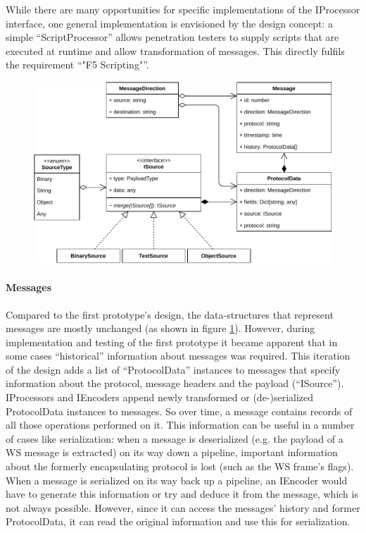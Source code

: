 While there are many opportunities for specific implementations of the IProcessor interface, one general implementation is envisioned by the design concept: a simple \enquote{ScriptProcessor} allows penetration testers to supply scripts that are executed at runtime and allow transformation of messages. This directly fulfils the requirement \enquote{"F5 Scripting"}.
\begin{figure}[h]
    \centering
    \includegraphics[width=14cm]{img/ch05/classes-4-messages.pdf}
    \label{fig:classes-4-messages}
\end{figure}
\paragraph{Messages}
Compared to the first prototype's design, the data-structures that represent messages are mostly unchanged (as shown in figure \ref{fig:classes-4-messages}). However, during implementation and testing of the first prototype it became apparent that in some cases \enquote{historical} information about messages was required. This iteration of the design adds a list of \enquote{ProtocolData} instances to messages that specify information about the protocol, message headers and the payload (\enquote{ISource}). IProcessors and IEncoders append newly transformed or (de-)serialized ProtocolData instances to messages. So over time, a message contains records of all those operations performed on it. This information can be useful in a number of cases like serialization: when a message is deserialized (e.g. the payload of a \ac{WS} message is extracted) on its way down a pipeline, important information about the formerly encapsulating protocol is lost (such as the \ac{WS} frame's flags). When a message is serialized on its way back up a pipeline, an IEncoder would have to generate this information or try and deduce it from the message, which is not always possible. However, since it can access the messages' history and former ProtocolData, it can read the original information and use this for serialization.

